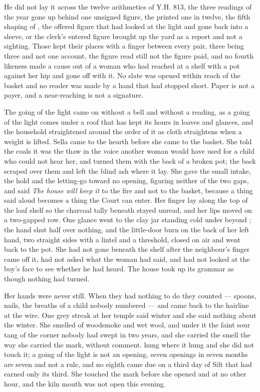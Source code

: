 He did not lay it across the twelve arithmetics of Y.H. 813, the three readings of the year gone up  behind one unsigned figure, the printed one in twelve, the fifth shaping of , the offered figure that had looked at the light and gone back into a sleeve, or the clerk's entered figure brought up the yard as a report and not a sighting. Those kept their places with a finger between every pair, three being three and not one account, the figure read still not the figure paid, and no fourth likeness made a cause out of a woman who had reached at a shelf with a pot against her hip and gone off with it. No slate was opened within reach of the basket and no reader was made by a hand that had stopped short. Paper is not a payer, and a near-reaching is not a signature.

\scenebreak

The going of the light came on without a bell and without a reading, as a going of the light comes under a roof that has kept its hours in loaves and glances, and the household straightened around the order of it as cloth straightens when a weight is lifted. Sella came to the hearth before she came to the basket. She told the coals it was the thaw in the voice another woman would have used for a child who could not hear her, and turned them with the back of a broken pot; the back scraped over them and left the blind ash where it lay. She gave the small intake, the hold and the letting-go toward no opening, figuring neither of the two gaps, and said \emph{The house will keep it} to the fire and not to the basket, because a thing said aloud becomes a thing the Court can enter. Her finger lay along the top of the loaf shelf so the charcoal tally beneath stayed unread, and her lips moved on a two-gapped row. One glance went to the clay jar standing cold under  beyond ; the hand shut half over nothing, and the little-door burn on the back of her left hand, two straight sides with a lintel and a threshold, closed on air and went back to the pot. She had not gone beneath the shelf after the neighbour's finger came off it, had not asked what the woman had said, and had not looked at the boy's face to see whether he had heard. The house took up its grammar as though nothing had turned.

Her hands were never still. When they had nothing to do they counted --- spoons, nails, the breaths of a child nobody numbered --- and came back to the hairline at the wire. One grey streak at her temple said winter and she said nothing about the winter. She smelled of woodsmoke and wet wool, and under it the faint sour tang of the corner nobody had swept in two years, and she carried the smell the way she carried the mark, without comment.  hung where it hung and she did not touch it; a going of the light is not an opening, seven openings in seven months are seven and not a rule, and no eighth came due on a third day of Silt that had earned only its third. She touched the mark before she opened  and at no other hour, and the kiln mouth was not open this evening.

